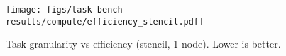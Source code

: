 \begin{figure}[t]
\centering
\texttt{[image: figs/task-bench-results/compute/efficiency\_stencil.pdf]}
\caption{Task granularity vs efficiency (stencil, 1 node). Lower is better.\label{fig:efficiency}}
\end{figure}
